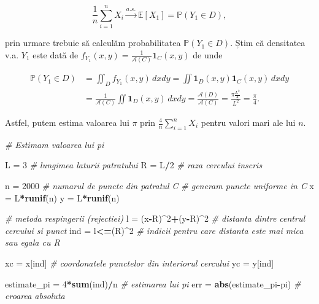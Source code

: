 \documentclass[]{article}
\newenvironment{Shaded}{\begin{snugshade}}{\end{snugshade}}
\newcommand{\KeywordTok}[1]{\textcolor[rgb]{0.13,0.29,0.53}{\textbf{#1}}}
\newcommand{\DecValTok}[1]{\textcolor[rgb]{0.00,0.00,0.81}{#1}}
\newcommand{\StringTok}[1]{\textcolor[rgb]{0.31,0.60,0.02}{#1}}
\newcommand{\CommentTok}[1]{\textcolor[rgb]{0.56,0.35,0.01}{\textit{#1}}}
\newcommand{\OperatorTok}[1]{\textcolor[rgb]{0.81,0.36,0.00}{\textbf{#1}}}
\newcommand{\NormalTok}[1]{#1}
\begin{document}
\[
  \displaystyle\frac{1}{n}\sum_{i=1}^{n}X_{i} \overset{a.s.}{\to} \mathbb{E}[X_1] = \mathbb{P}(Y_1\in D),
\]

prin urmare trebuie să calculăm probabilitatea \(\mathbb{P}(Y_1\in D)\).
Știm că densitatea v.a. \(Y_1\) este dată de
\(f_{Y_1}(x,y)=\frac{1}{\mathcal{A}(C)}\mathbf{1}_{C}(x,y)\) de unde

\[
\begin{aligned}
  \mathbb{P}(Y_1\in D) &= \iint_{D}f_{Y_1}(x,y)\,dxdy = \iint \mathbf{1}_{D}(x,y)\mathbf{1}_{C}(x,y)\,dxdy\\
                       &= \frac{1}{\mathcal{A}(C)}\iint \mathbf{1}_{D}(x,y)\,dxdy = \frac{\mathcal{A}(D)}{\mathcal{A}(C)} = \frac{\pi \frac{L^2}{4}}{L^2} = \frac{\pi}{4}.
\end{aligned}
\]

Astfel, putem estima valoarea lui \(\pi\) prin
\(\displaystyle\frac{4}{n}\sum_{i=1}^{n}X_{i}\) pentru valori mari ale
lui \(n\).

\begin{Shaded}
\begin{Highlighting}[]
\CommentTok{# Estimam valoarea lui pi}

\NormalTok{L =}\StringTok{ }\DecValTok{3} \CommentTok{# lungimea laturii patratului }
\NormalTok{R =}\StringTok{ }\NormalTok{L}\OperatorTok{/}\DecValTok{2} \CommentTok{# raza cercului inscris}

\NormalTok{n =}\StringTok{ }\DecValTok{2000} \CommentTok{# numarul de puncte din patratul C}
\CommentTok{# generam puncte uniforme in C}
\NormalTok{x =}\StringTok{ }\NormalTok{L}\OperatorTok{*}\KeywordTok{runif}\NormalTok{(n)}
\NormalTok{y =}\StringTok{ }\NormalTok{L}\OperatorTok{*}\KeywordTok{runif}\NormalTok{(n)}

\CommentTok{# metoda respingerii (rejectiei)}
\NormalTok{l =}\StringTok{ }\NormalTok{(x}\OperatorTok{-}\NormalTok{R)}\OperatorTok{^}\DecValTok{2}\OperatorTok{+}\NormalTok{(y}\OperatorTok{-}\NormalTok{R)}\OperatorTok{^}\DecValTok{2} \CommentTok{# distanta dintre centrul cercului si punct}
\NormalTok{ind =}\StringTok{ }\NormalTok{l}\OperatorTok{<=}\NormalTok{(R)}\OperatorTok{^}\DecValTok{2} \CommentTok{# indicii pentru care distanta este mai mica sau egala cu R}

\NormalTok{xc =}\StringTok{ }\NormalTok{x[ind] }\CommentTok{# coordonatele punctelor din interiorul cercului  }
\NormalTok{yc =}\StringTok{ }\NormalTok{y[ind] }

\NormalTok{estimate_pi =}\StringTok{ }\DecValTok{4}\OperatorTok{*}\KeywordTok{sum}\NormalTok{(ind)}\OperatorTok{/}\NormalTok{n }\CommentTok{# estimarea lui pi}
\NormalTok{err =}\StringTok{ }\KeywordTok{abs}\NormalTok{(estimate_pi}\OperatorTok{-}\NormalTok{pi) }\CommentTok{# eroarea absoluta}
\end{Highlighting}
\end{Shaded}
\end{document}
